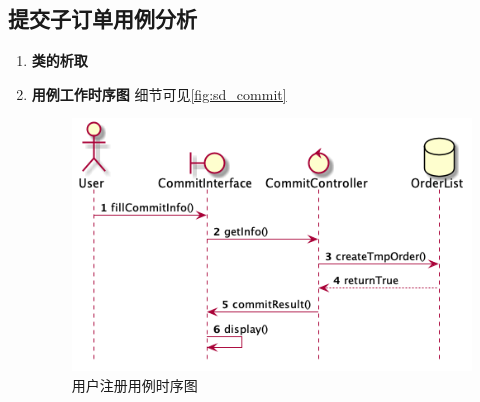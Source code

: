 	\subsection{提交子订单用例分析} %
	\label{sub:提交子订单用例分析}
	\begin{enumerate}
		\item \textbf{类的析取}

		\item \textbf{用例工作时序图}
		细节可见\autoref{fig:sd_commit}

		\begin{figure}[htp]
		    \centering
		    \includegraphics[width=12cm]{figure/sequenceDiagram/sd_commitOrder.png}
		    \caption{用户注册用例时序图}
		    \label{fig:sd_commit}
		\end{figure}

	\end{enumerate}

